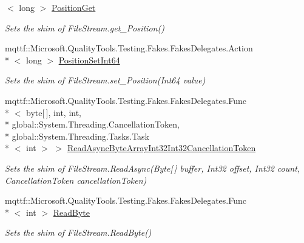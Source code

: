 \begin{DoxyCompactItemize}
$<$ long $>$ \hyperlink{class_system_1_1_i_o_1_1_fakes_1_1_shim_file_stream_a9f54800452b0c6b7ff7e83b58df31db1}{Position\-Get}
\begin{DoxyCompactList}\small\item\em Sets the shim of File\-Stream.\-get\-\_\-\-Position()\end{DoxyCompactList}\item 
mqttf\-::\-Microsoft.\-Quality\-Tools.\-Testing.\-Fakes.\-Fakes\-Delegates.\-Action\\*
$<$ long $>$ \hyperlink{class_system_1_1_i_o_1_1_fakes_1_1_shim_file_stream_abe8c2681805fe704111c9ddc99c83fc7}{Position\-Set\-Int64}
\begin{DoxyCompactList}\small\item\em Sets the shim of File\-Stream.\-set\-\_\-\-Position(\-Int64 value)\end{DoxyCompactList}\item 
mqttf\-::\-Microsoft.\-Quality\-Tools.\-Testing.\-Fakes.\-Fakes\-Delegates.\-Func\\*
$<$ byte\mbox{[}$\,$\mbox{]}, int, int, \\*
global\-::\-System.\-Threading.\-Cancellation\-Token, \\*
global\-::\-System.\-Threading.\-Tasks.\-Task\\*
$<$ int $>$ $>$ \hyperlink{class_system_1_1_i_o_1_1_fakes_1_1_shim_file_stream_a4e694267e31b0e4fecc754ecca5dd198}{Read\-Async\-Byte\-Array\-Int32\-Int32\-Cancellation\-Token}
\begin{DoxyCompactList}\small\item\em Sets the shim of File\-Stream.\-Read\-Async(\-Byte\mbox{[}$\,$\mbox{]} buffer, Int32 offset, Int32 count, Cancellation\-Token cancellation\-Token)\end{DoxyCompactList}\item 
mqttf\-::\-Microsoft.\-Quality\-Tools.\-Testing.\-Fakes.\-Fakes\-Delegates.\-Func\\*
$<$ int $>$ \hyperlink{class_system_1_1_i_o_1_1_fakes_1_1_shim_file_stream_aa8f842c14e6454f1dcd5227bcc2a74d8}{Read\-Byte}
\begin{DoxyCompactList}\small\item\em Sets the shim of File\-Stream.\-Read\-Byte()\end{DoxyCompactList}\item 

\end{DoxyCompactItemize}
